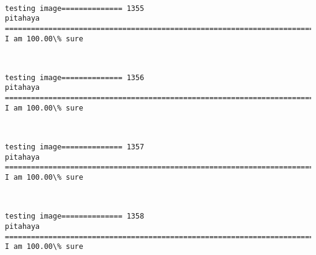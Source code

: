 \documentclass[11pt]{article}
\begin{document}
    \begin{center}
    \end{center}
    { \hspace*{\fill} \\}
    
    \begin{Verbatim}[commandchars=\\\{\}]
testing image============== 1355
pitahaya
============================================================================
I am 100.00\% sure

    \end{Verbatim}

    \begin{center}
    \end{center}
    { \hspace*{\fill} \\}
    
    \begin{Verbatim}[commandchars=\\\{\}]
testing image============== 1356
pitahaya
============================================================================
I am 100.00\% sure

    \end{Verbatim}

    \begin{center}
    \end{center}
    { \hspace*{\fill} \\}
    
    \begin{Verbatim}[commandchars=\\\{\}]
testing image============== 1357
pitahaya
============================================================================
I am 100.00\% sure

    \end{Verbatim}

    \begin{center}
    \end{center}
    { \hspace*{\fill} \\}
    
    \begin{Verbatim}[commandchars=\\\{\}]
testing image============== 1358
pitahaya
============================================================================
I am 100.00\% sure

    \end{Verbatim}
\end{document}
